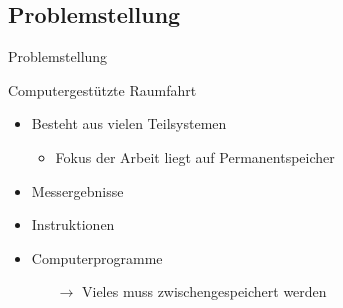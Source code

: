 \documentclass[
	,footlinenumber
	,navline=true
	,footlineauthor
	,ngerman
	]{beamer}
\begin{document}
\subsection{Problemstellung}
\begin{frame}{Problemstellung}
\begin{block}{Computergestützte Raumfahrt}
\begin{itemize}
\item Besteht aus vielen Teilsystemen
\begin{itemize}
\item Fokus der Arbeit liegt auf Permanentspeicher
\end{itemize}
\item Messergebnisse 
\item Instruktionen 
\item Computerprogramme 
\begin{itemize}
\item[$\rightarrow$] Vieles muss zwischengespeichert werden
\end{itemize}

\end{itemize}


\end{block}

\end{frame}
\end{document}
